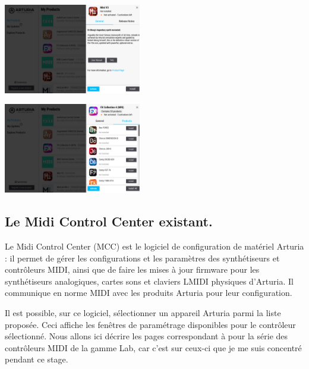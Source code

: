 \documentclass[francais]{rapportPFE}  %
\begin{document}
\begin{center}
    \centering
    \begin{minipage}{.5\textwidth}
    \centering
    \includegraphics[width=6cm]{graphics/details.png}
    \label{fig:test1}
    \end{minipage}%
    \begin{minipage}{.5\textwidth}
    \centering
    \includegraphics[width=6cm]{graphics/detailsbundle.png}
    \label{fig:test2}
    \end{minipage}
    \end{center}




\subsection{Le Midi Control Center existant.}

Le Midi Control Center \cite{mcc}
 (MCC) est le logiciel de configuration de matériel Arturia : il
permet de gérer les configurations et les paramètres des synthétiseurs et contrôleurs MIDI, ainsi que de faire les mises à jour firmware pour les synthétiseurs analogiques, cartes sons et claviers LMIDI physiques d'Arturia. Il communique en norme MIDI avec les produits Arturia pour leur configuration.

Il est possible, sur ce logiciel, sélectionner un appareil Arturia parmi la liste proposée. Ceci affiche les fenêtres de paramétrage disponibles pour le contrôleur sélectionné. Nous allons ici décrire les pages correspondant à pour la série des contrôleurs MIDI de la gamme Lab, car c'est sur ceux-ci que je me suis concentré pendant ce stage.
\end{document}
